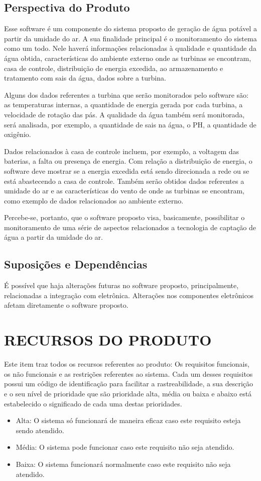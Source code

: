 \subsection*{Perspectiva do Produto}
Esse software é um componente do sistema proposto de geração de água potável a partir da umidade do ar. A sua finalidade principal é o monitoramento do sistema como um todo. Nele haverá informações relacionadas à qualidade e quantidade da água obtida, características do ambiente externo onde as turbinas se encontram, casa de controle, distribuição de energia excedida, ao armazenamento e tratamento com sais da água, dados sobre a turbina. 

	Alguns dos dados referentes a turbina que serão monitorados pelo software são: as temperaturas internas, a quantidade de energia gerada por cada turbina, a velocidade de rotação das pás. A qualidade da água também será monitorada, será analisada, por exemplo, a quantidade de sais na água, o PH, a quantidade de oxigênio.
	
	Dados relacionados à casa de controle incluem, por exemplo, a voltagem das baterias, a falta ou presença de energia. Com relação a distribuição de energia, o software deve mostrar se a energia excedida está sendo direcionada a rede ou se está abastecendo a casa de controle. Também serão obtidos dados referentes a umidade do ar e as características do vento de onde as turbinas se encontram, como exemplo de dados relacionados ao ambiente externo.
	
	Percebe-se, portanto, que o software proposto visa, basicamente, possibilitar o monitoramento de uma série de aspectos relacionados a tecnologia de captação de água a partir da umidade do ar.

\subsection*{Suposições e Dependências}
É possível que haja alterações futuras no software proposto, principalmente, relacionadas a integração com eletrônica. Alterações nos componentes eletrônicos afetam diretamente o software proposto.

\section*{RECURSOS DO PRODUTO}
Este item traz todos os recursos referentes ao produto: Os requisitos funcionais, os não funcionais e as restrições referentes ao sistema. Cada um desses requisitos possui um código de identificação para facilitar a rastreabilidade, a sua descrição e o seu nível de prioridade que são prioridade alta, média ou baixa e abaixo está estabelecido o significado de cada uma destas prioridades.
\begin{itemize}
\item Alta:  O sistema só funcionará de maneira eficaz caso este requisito esteja sendo atendido.
\item Média: O sistema pode 	funcionar caso este requisito não seja atendido.	
\item Baixa: O sistema funcionará 	normalmente caso este requisito não seja atendido.
\end{itemize}

